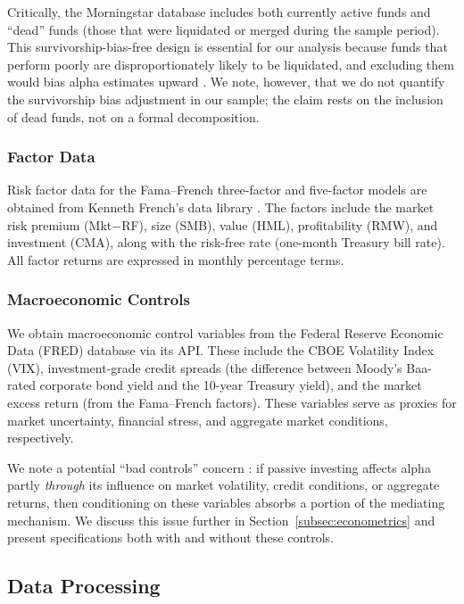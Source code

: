 \documentclass[11pt, a4paper]{article}
\begin{document}
Critically, the Morningstar database includes both currently active funds and ``dead'' funds (those that were liquidated or merged during the sample period). This survivorship-bias-free design is essential for our analysis because funds that perform poorly are disproportionately likely to be liquidated, and excluding them would bias alpha estimates upward \parencite{elton1996}. We note, however, that we do not quantify the survivorship bias adjustment in our sample; the claim rests on the inclusion of dead funds, not on a formal decomposition.

\subsubsection{Factor Data}

Risk factor data for the Fama--French three-factor and five-factor models are obtained from Kenneth French's data library \parencite{french_data}. The factors include the market risk premium (Mkt$-$RF), size (SMB), value (HML), profitability (RMW), and investment (CMA), along with the risk-free rate (one-month Treasury bill rate). All factor returns are expressed in monthly percentage terms.

\subsubsection{Macroeconomic Controls}

We obtain macroeconomic control variables from the Federal Reserve Economic Data (FRED) database via its API. These include the CBOE Volatility Index (VIX), investment-grade credit spreads (the difference between Moody's Baa-rated corporate bond yield and the 10-year Treasury yield), and the market excess return (from the Fama--French factors). These variables serve as proxies for market uncertainty, financial stress, and aggregate market conditions, respectively.

We note a potential ``bad controls'' concern \parencite{angrist2009}: if passive investing affects alpha partly \textit{through} its influence on market volatility, credit conditions, or aggregate returns, then conditioning on these variables absorbs a portion of the mediating mechanism. We discuss this issue further in Section~\ref{subsec:econometrics} and present specifications both with and without these controls.

\subsection{Data Processing}
\label{subsec:data_processing}
\end{document}

